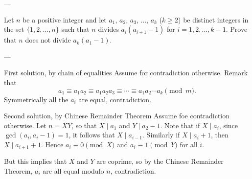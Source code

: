 
---

Let $n$ be a positive integer and let $a_1$, $a_2$, $a_3$, $\ldots$, $a_k$ ($k\ge 2$) be distinct integers in the set $\{1,2,\ldots,n\}$ such that $n$ divides $a_i(a_{i+1}-1)$ for $i=1,2,\ldots,k-1$. Prove that $n$ does not divide $a_k(a_1-1)$.

---

\begin{customenv}{First solution, by chain of equalities}
    Assume for contradiction otherwise. Remark that \[a_1\equiv a_1a_2\equiv a_1a_2a_3\equiv\cdots\equiv a_1a_2\cdots a_k\pmod m.\]
    Symmetrically all the $a_i$ are equal, contradiction.
\end{customenv}
\begin{customenv}{Second solution, by Chinese Remainder Theorem}
    Assume foe contradiction otherwise. Let $n=XY$, so that $X\mid a_1$ and $Y\mid a_2-1$. Note that if $X\mid a_i$, since $\gcd(a_i,a_i-1)=1$, it follows that $X\mid a_{i-1}$. Similarly if $X\mid a_i+1$, then $X\mid a_{i+1}+1$. Hence $a_i\equiv 0\pmod X$ and $a_i\equiv 1\pmod Y$ for all $i$.

    But this implies that $X$ and $Y$ are coprime, so by the Chinese Remainder Theorem, $a_i$ are all equal modulo $n$, contradiction.
\end{customenv}

